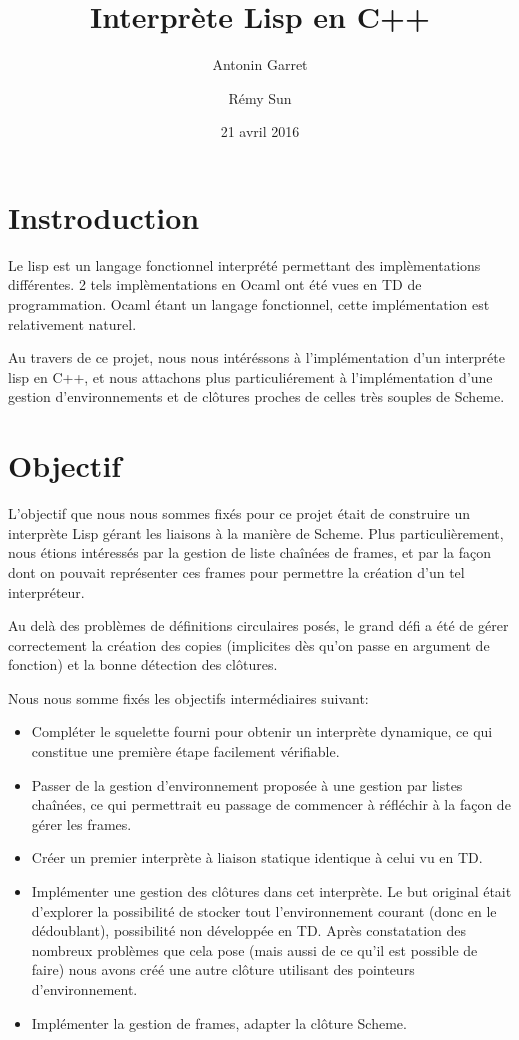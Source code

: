 \documentclass[a4paper,11pt]{article}
\title{Interprète Lisp en C++}
\author{Antonin Garret \and Rémy Sun}
\date{21 avril 2016}
\begin{document}
\maketitle

\section{Instroduction}

Le lisp est un langage fonctionnel interprété permettant des implèmentations
différentes. 2 tels implèmentations en Ocaml ont été vues en TD de
programmation. Ocaml étant un langage fonctionnel, cette implémentation est
relativement naturel.

Au travers de ce projet, nous nous intéréssons à l'implémentation d'un
interpréte lisp en C++, et nous attachons plus particuliérement à
l'implémentation d'une gestion d'environnements et de clôtures proches de celles
très souples de Scheme.

\section{Objectif}

L'objectif que nous nous sommes fixés pour ce projet était de construire un
interprète Lisp gérant les liaisons à la manière de Scheme. Plus
particulièrement, nous étions intéressés par la gestion de liste chaînées de
frames, et par la façon dont on pouvait représenter ces frames pour permettre la
création d'un tel interpréteur.

Au delà des problèmes de définitions circulaires posés, le grand défi a été de
gérer correctement la création des copies (implicites dès qu'on passe en
argument de fonction) et la bonne détection des clôtures.

Nous nous somme fixés les objectifs intermédiaires suivant:
\begin{itemize}
\item Compléter le squelette fourni pour obtenir un interprète dynamique, ce qui
  constitue une première étape facilement vérifiable.
\item Passer de la gestion d'environnement proposée à une gestion par listes
  chaînées, ce qui permettrait eu passage de commencer à réfléchir à la façon de
  gérer les frames.
\item Créer un premier interprète à liaison statique identique à celui vu en TD.
\item Implémenter une gestion des clôtures dans cet interprète. Le but original
  était d'explorer la possibilité de stocker tout l'environnement courant (donc
  en le dédoublant), possibilité non développée en TD. Après constatation des
  nombreux problèmes que cela pose (mais aussi de ce qu'il est possible de
  faire) nous avons créé une autre clôture utilisant des pointeurs
  d'environnement.
\item Implémenter la gestion de frames, adapter la clôture Scheme.
\end{itemize}
\end{document}
